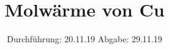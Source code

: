 

\subject{V47}
\title{Molwärme von Cu}
\date{%
  Durchführung: 20.11.19
  \hspace{3em}
  Abgabe: 29.11.19
}



\maketitle
\thispagestyle{empty}
\tableofcontents
\newpage







\printbibliography{}


